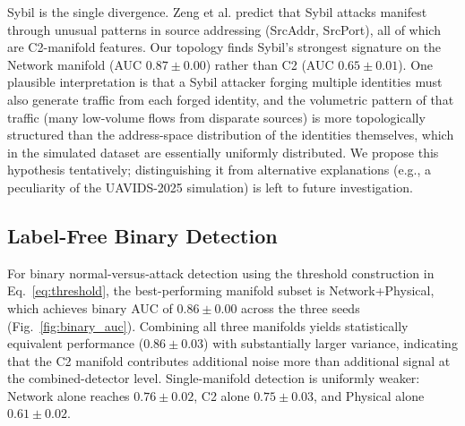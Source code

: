 \documentclass[conf]{new-aiaa}
\begin{document}
Sybil is the single divergence. Zeng et al. predict that Sybil attacks manifest through unusual patterns in source addressing (SrcAddr, SrcPort), all of which are C2-manifold features. Our topology finds Sybil's strongest signature on the Network manifold (AUC $0.87 \pm 0.00$) rather than C2 (AUC $0.65 \pm 0.01$). One plausible interpretation is that a Sybil attacker forging multiple identities must also generate traffic from each forged identity, and the volumetric pattern of that traffic (many low-volume flows from disparate sources) is more topologically structured than the address-space distribution of the identities themselves, which in the simulated dataset are essentially uniformly distributed. We propose this hypothesis tentatively; distinguishing it from alternative explanations (e.g., a peculiarity of the UAVIDS-2025 simulation) is left to future investigation.

\subsection{Label-Free Binary Detection}

For binary normal-versus-attack detection using the threshold construction in Eq.~\eqref{eq:threshold}, the best-performing manifold subset is Network+Physical, which achieves binary AUC of $0.86 \pm 0.00$ across the three seeds (Fig.~\ref{fig:binary_auc}). Combining all three manifolds yields statistically equivalent performance ($0.86 \pm 0.03$) with substantially larger variance, indicating that the C2 manifold contributes additional noise more than additional signal at the combined-detector level. Single-manifold detection is uniformly weaker: Network alone reaches $0.76 \pm 0.02$, C2 alone $0.75 \pm 0.03$, and Physical alone $0.61 \pm 0.02$.
\end{document}
